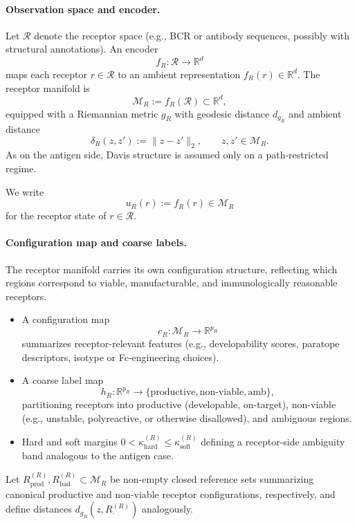\documentclass[11pt]{article}
\newcommand{\Rcal}{\mathcal{R}}
\newcommand{\M}{\mathcal{M}}
\begin{document}
\paragraph{Observation space and encoder.}
Let $\Rcal$ denote the receptor space (e.g., BCR or antibody sequences, possibly with structural annotations). An encoder
\[
  f_R : \Rcal \to \mathbb{R}^d
\]
maps each receptor $r \in \Rcal$ to an ambient representation $f_R(r) \in \mathbb{R}^d$. The receptor manifold is
\[
  \M_R := f_R(\Rcal) \subset \mathbb{R}^d,
\]
equipped with a Riemannian metric $g_R$ with geodesic distance $d_{g_R}$ and ambient distance
\[
  \delta_R(z, z') := \bigl\| z - z' \bigr\|_2, \qquad z, z' \in \M_R.
\]
As on the antigen side, Davis structure is assumed only on a path-restricted regime.

We write
\[
  u_R(r) := f_R(r) \in \M_R
\]
for the receptor state of $r \in \Rcal$.

\paragraph{Configuration map and coarse labels.}
The receptor manifold carries its own configuration structure, reflecting which regions correspond to viable, manufacturable, and immunologically reasonable receptors.

\begin{itemize}
  \item A configuration map
  \[
    c_R : \M_R \to \mathbb{R}^{p_R}
  \]
  summarizes receptor-relevant features (e.g., developability scores, paratope descriptors, isotype or Fc-engineering choices).

  \item A coarse label map
  \[
    h_R : \mathbb{R}^{p_R} \to \{\text{productive},\text{non-viable},\mathrm{amb}\},
  \]
  partitioning receptors into productive (developable, on-target), non-viable (e.g., unstable, polyreactive, or otherwise disallowed), and ambiguous regions.

  \item Hard and soft margins $0 < \kappa^{(R)}_{\mathrm{hard}} \le \kappa^{(R)}_{\mathrm{soft}}$ defining a receptor-side ambiguity band analogous to the antigen case.
\end{itemize}

Let $R^{(R)}_{\mathrm{prod}}, R^{(R)}_{\mathrm{bad}} \subset \M_R$ be non-empty closed reference sets summarizing canonical productive and non-viable receptor configurations, respectively, and define distances $d_{g_R}(z, R^{(R)}_{\cdot})$ analogously.
\end{document}
